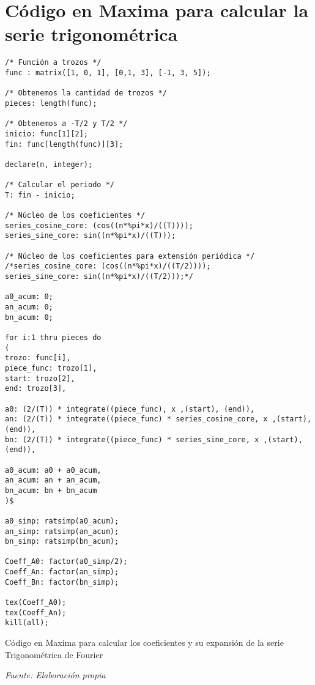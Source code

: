 \section{Código en Maxima para calcular la serie trigonométrica} \label{app3:maxima_trig_proto}
\begin{longlisting}
	\begin{verbatim}
/* Función a trozos */
func : matrix([1, 0, 1], [0,1, 3], [-1, 3, 5]);

/* Obtenemos la cantidad de trozos */
pieces: length(func);

/* Obtenemos a -T/2 y T/2 */
inicio: func[1][2];
fin: func[length(func)][3];

declare(n, integer);

/* Calcular el periodo */
T: fin - inicio;

/* Núcleo de los coeficientes */
series_cosine_core: (cos((n*%pi*x)/((T))));
series_sine_core: sin((n*%pi*x)/((T)));

/* Núcleo de los coeficientes para extensión periódica */
/*series_cosine_core: (cos((n*%pi*x)/((T/2))));
series_sine_core: sin((n*%pi*x)/((T/2)));*/

a0_acum: 0;
an_acum: 0;
bn_acum: 0;

for i:1 thru pieces do
(
trozo: func[i],
piece_func: trozo[1],
start: trozo[2],
end: trozo[3],

a0: (2/(T)) * integrate((piece_func), x ,(start), (end)),
an: (2/(T)) * integrate((piece_func) * series_cosine_core, x ,(start), (end)),
bn: (2/(T)) * integrate((piece_func) * series_sine_core, x ,(start), (end)),

a0_acum: a0 + a0_acum,
an_acum: an + an_acum,
bn_acum: bn + bn_acum
)$

a0_simp: ratsimp(a0_acum);
an_simp: ratsimp(an_acum);
bn_simp: ratsimp(bn_acum);

Coeff_A0: factor(a0_simp/2);
Coeff_An: factor(an_simp);
Coeff_Bn: factor(bn_simp);

tex(Coeff_A0);
tex(Coeff_An);
kill(all);
	\end{verbatim}
	\caption[Código en Maxima para calcular los coeficientes y su expansión de la serie Trigonométrica de Fourier]{Código en Maxima para calcular los coeficientes y su expansión de la serie Trigonométrica de Fourier} \textit{Fuente: Elaboración propia}
\end{longlisting}


